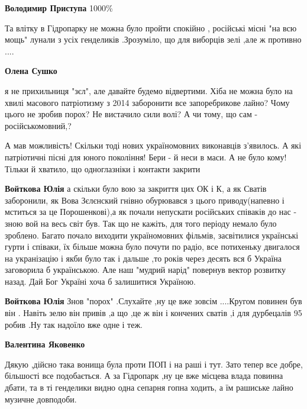 \begin{itemize}
\begin{itemize} %
\textbf{Володимир Приступа} 1000\%
\end{itemize} %


Та влітку в Гідропарку не можна було пройти спокійно , російські місні "на всю
мощь" лунали з усіх генделиків .Зрозуміло, що для виборців зелі ,але ж противно
....

\begin{itemize} %
\textbf{Олена Сушко} 

я не прихильниця "зєл", але давайте будемо відвертими. Хіба не можна було на
хвилі масового патріотизму з 2014 заборонити все запоребрикове лайно? Чому
цього не зробив порох? Не вистачило сили волі? А чи тому, що сам -
російськомовний,?

А мав можливість! Скільки тоді нових україномовних виконавців з'явилось. А які
патріотичні пісні для юного покоління! Бери - й неси в маси. А не було кому!
Тільки й хватило, що одноглазніки і контакти закрити

\textbf{Войткова Юлія} а скільки було вою за закриття цих ОК і К, а як Сватів
заборонили, як Вова Зєлєнский гнівно обурювався з цього приводу(напевно і
мститься за це Порошенкові),а як почали непускати російських співаків до нас -
зною вой на весь світ був.  Так що не кажіть, для того періоду немало було
зроблено. Багато почало виходити україномовних фільмів, засвітилися українські
гурти і співаки, їх більше можна було почути по радіо, все потихеньку двигалося
на укранізацію і якби було так і дальше ,то років через десять вся б Україна
заговорила б українською. Але наш "мудрий нарід" повернув вектор розвитку назад.
Дай Бог Україні хоча б залишитися Україною.

\textbf{Войткова Юлія} Знов "порох" .Слухайте ,ну це вже зовсім ....Кругом повинен був він . Навіть зелю він привів ,а що ,це ж він і кончених сватів ,і для дурбецалів 95 робив .Ну так надоїло вже одне і теж.

\textbf{Валентина Яковенко} 

Дякую ,дійсно така вонища була проти ПОП і на раші і тут. Зато тепер все добре,
більшості все подобається. А за Гідропарк ,ну це вже місцева влада повинна
дбати, та в ті генделики видно одна сепарня гопна ходить, а їм рашиське лайно
музичне довподоби.

\end{itemize} %


\end{itemize}
